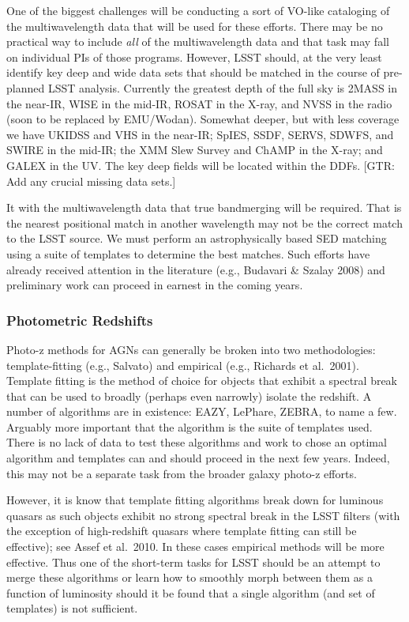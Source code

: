 One of the biggest challenges will be conducting a sort of VO-like cataloging of the multiwavelength data that will be used for these efforts.  There may be no practical way to include {\em all} of the multiwavelength data and that task may fall on individual PIs of those programs.  However, LSST should, at the very least identify key deep and wide data sets that should be matched in the course of pre-planned LSST analysis.  Currently the greatest depth of the full sky is 2MASS in the near-IR, WISE in the mid-IR, ROSAT in the X-ray, and NVSS in the radio (soon to be replaced by EMU/Wodan).  Somewhat deeper, but with less coverage we have UKIDSS and VHS in the near-IR; SpIES, SSDF, SERVS, SDWFS, and SWIRE in the mid-IR; the XMM Slew Survey and ChAMP in the X-ray; and GALEX in the UV.   The key deep fields will be located within the DDFs.  [GTR: Add any crucial missing data sets.]

It with the multiwavelength data that true bandmerging will be required.  That is the nearest positional match in another wavelength may not be the correct match to the LSST source.  We must perform an astrophysically based SED matching using a suite of templates to determine the best matches.  Such efforts have already received attention in the literature (e.g., Budavari \& Szalay 2008) and preliminary work can proceed in earnest in the coming years.

\subsubsection{Photometric Redshifts}

Photo-z methods for AGNs can generally be broken into two methodologies: template-fitting (e.g., Salvato) and empirical (e.g., Richards et al.\ 2001).  Template fitting is the method of choice for objects that exhibit a spectral break that can be used to broadly (perhaps even narrowly) isolate the redshift.   A number of algorithms are in existence: EAZY, LePhare, ZEBRA, to name a few.  Arguably more important that the algorithm is the suite of templates used.   There is no lack of data to test these algorithms and work to chose an optimal algorithm and templates can and should proceed in the next few years.  Indeed, this may not be a separate task from the broader galaxy photo-z efforts.

However, it is know that template fitting algorithms break down for luminous quasars as such objects exhibit no strong spectral break in the LSST filters (with the exception of high-redshift quasars where template fitting can still be effective); see Assef et al.\ 2010.  In these cases empirical methods will be more effective.  Thus one of the short-term tasks for LSST should be an attempt to merge these algorithms or learn how to smoothly morph between them as a function of luminosity should it be found that a single algorithm (and set of templates) is not sufficient.

